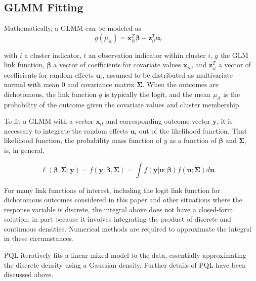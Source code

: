 \documentclass[Afour,times,sagev,doublespace]{sagej}
\begin{document}
\begin{sm}

\subsection{GLMM Fitting}
Mathematically, a GLMM can be modeled as
    \begin{equation}
        g(\mu_{it})=\mathbf{x}^T_{it} \boldsymbol{\beta} + \mathbf{z}^T_{it}\mathbf{u}_i
    \end{equation}
    
    with
 $i$ a cluster indicator, $t$ an observation indicator within cluster $i$, $g$ the GLM link function, $\boldsymbol{\beta}$ a vector of coefficients for covariate values $\mathbf{x}_{it}$, and $\mathbf{z}^T_{it}$ a vector of coefficients for random effects $\mathbf{u}_i$, assumed to be distributed as multivariate normal with mean $0$ and covariance matrix $\mathbf{\Sigma}$. When the outcomes are dichotomous, the link function $g$ is typically the logit, and the mean $\mu_{it}$ is the probability of the outcome given the covariate values and cluster membership.
 
To fit a GLMM with a vector $\mathbf{x}_{it}$ and corresponding outcome vector $\mathbf{y}$, it is necessary to integrate the random effects $\mathbf{u}_i$ out of the likelihood function\cite{rodriguez_assessment_1995}. That likelihood function, the probability mass function of $y$ as a function of $\boldsymbol{\beta}$ and $\mathbf{\Sigma}$\cite{agresti_categorical_2013}, is, in general,

\begin{equation}
 \ell(\boldsymbol{\beta}, \mathbf{\Sigma} ; \mathbf{y})=f(\mathbf{y};\boldsymbol{\beta}, \mathbf{\Sigma})=\int f(\mathbf{y}|\mathbf{u};\boldsymbol{\beta})f(\mathbf{u}; \mathbf{\Sigma})d\mathbf{u}.   
\end{equation}

For many link functions of interest, including the logit link function for dichotomous outcomes considered in this paper and other situations where the response variable is discrete, the integral above does not have a closed-form solution, in part because it involves integrating the product of discrete and continuous densities\cite{ng_estimation_2006}. Numerical methods are required to approximate the integral in these circumstances.

PQL iteratively fits a linear mixed model\cite{lin_bias_1996} to the data, essentially approximating the discrete density using a Gaussian density\cite{ng_estimation_2006}. Further details of PQL have been discussed above.


\end{sm}
\end{document}
